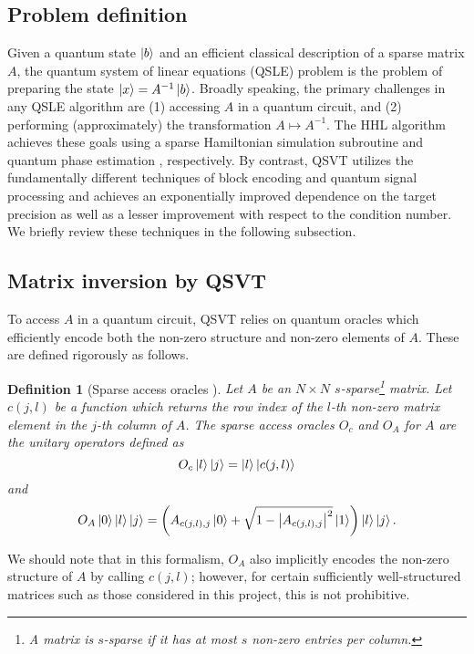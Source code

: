\documentclass[10pt, twocolumn]{article}
\newtheorem{definition}[theorem]{Definition}
\begin{document}
\subsection{Problem definition}

Given a quantum state $\ket{b}$ and an efficient classical description of a sparse matrix $A$, the quantum system of linear equations (QSLE) problem is the problem of preparing the state $\ket{x} = A^{-1} \ket{b}$. Broadly speaking, the primary challenges in any QSLE algorithm are (1) accessing $A$ in a quantum circuit, and (2) performing (approximately) the transformation $A \mapsto A^{-1}$. The HHL algorithm \cite{harrow2009quantum} achieves these goals using a sparse Hamiltonian simulation subroutine \cite{berry2007efficient} and quantum phase estimation \cite{kitaev1995quantum}, respectively. By contrast, QSVT utilizes the fundamentally different techniques of block encoding \cite{gilyen2019quantum} and quantum signal processing \cite{low2017optimal} and achieves an exponentially improved dependence on the target precision as well as a lesser improvement with respect to the condition number. We briefly review these techniques in the following subsection.

\subsection{Matrix inversion by QSVT}

To access $A$ in a quantum circuit, QSVT relies on quantum oracles which efficiently encode both the non-zero structure and non-zero elements of $A$. These are defined rigorously as follows.

\begin{definition}[Sparse access oracles \cite{camps2203explicit}]
	\label{def::sparse_access_oracles}
	Let $A$ be an $N \times N$ $s$-sparse\footnote{A matrix is \textit{$s$-sparse} if it has at most $s$ non-zero entries per column.} matrix. Let $c(j,l)$ be a function which returns the row index of the $l$-th non-zero matrix element in the $j$-th column of $A$. The sparse access oracles $O_c$ and $O_A$ for $A$ are the unitary operators defined as
	\[
		O_c \ket{l}\ket{j} = \ket{l}\ket{c(j, l)}
	\]
	and
	\[
		O_A \ket{0}\ket{l}\ket{j} = \left( A_{c(j, l), j} \ket{0} + \sqrt{1 - \abs{A_{c(j, l), j}}^2 } \ket{1} \right) \ket{l} \ket{j}.
	\]
\end{definition}

We should note that in this formalism, $O_A$ also implicitly encodes the non-zero structure of $A$ by calling $c(j, l)$; however, for certain sufficiently well-structured matrices such as those considered in this project, this is not prohibitive.
\end{document}
